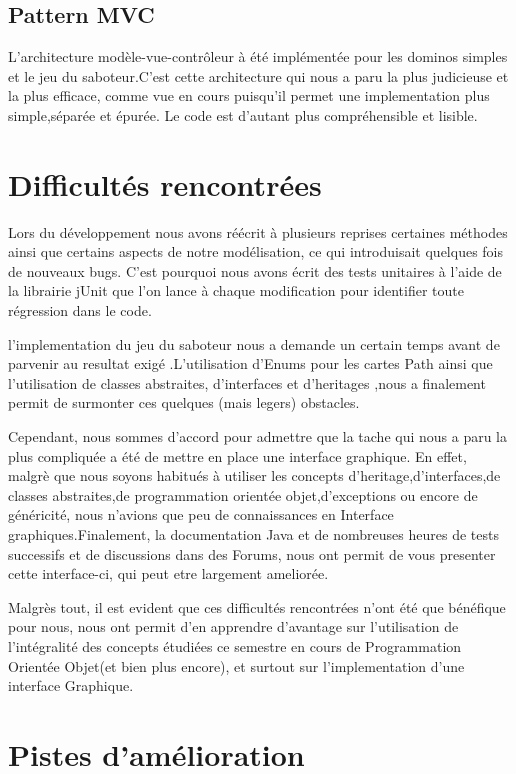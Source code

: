 \documentclass[a4paper, 11pt, DIV=9]{scrartcl}
\begin{document}
\subsection{Pattern MVC}

L'architecture modèle-vue-contrôleur à été implémentée pour les dominos simples
et le jeu du saboteur.C'est cette architecture qui nous a paru la plus judicieuse et la plus efficace,
comme vue en cours puisqu'il permet une implementation plus simple,séparée et épurée.
Le code est d'autant plus compréhensible et lisible.

\section{Difficultés rencontrées}

Lors du développement nous avons réécrit à plusieurs reprises certaines
méthodes ainsi que certains aspects de notre modélisation,
ce qui introduisait quelques fois de nouveaux bugs. C'est pourquoi
nous avons écrit des tests unitaires à l'aide de la librairie jUnit que l'on lance à
chaque modification pour identifier toute régression dans le code.

l'implementation du jeu du saboteur nous a demande un certain temps avant de parvenir
au resultat exigé .L'utilisation d'Enums pour les cartes Path ainsi que l'utilisation de 
classes abstraites, d'interfaces et d'heritages ,nous a finalement permit de surmonter
ces quelques (mais legers) obstacles.

Cependant, nous sommes d'accord pour admettre que la tache qui nous a paru la plus compliquée a été 
de mettre en place une interface graphique. En effet, malgrè que nous soyons habitués à utiliser les concepts 
d'heritage,d'interfaces,de classes abstraites,de programmation orientée objet,d'exceptions ou encore de généricité, 
nous n'avions que peu de connaissances en Interface graphiques.Finalement, la documentation
Java et de nombreuses heures de tests successifs et de discussions dans des Forums,
nous ont permit de vous presenter cette interface-ci, qui peut etre largement ameliorée.

Malgrès tout, il est evident que ces difficultés rencontrées n'ont été que bénéfique pour nous,
nous ont permit d'en apprendre d'avantage sur l'utilisation de l'intégralité des concepts étudiées ce semestre 
en cours de Programmation Orientée Objet(et bien plus encore), et surtout sur l'implementation d'une interface Graphique.


\section{Pistes d'amélioration}
\end{document}
